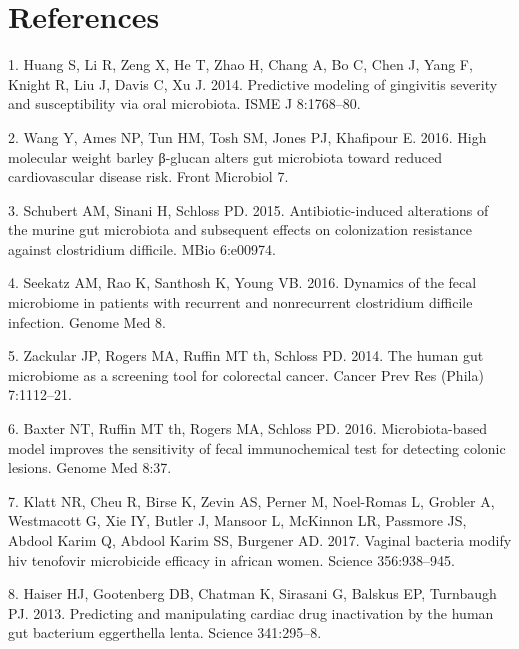 \documentclass[11pt,]{article}
\begin{document}
\newpage

\section*{References}\label{references}

\hypertarget{refs}{}
\hypertarget{ref-Huang_gingivitis_2014}{}
1. Huang S, Li R, Zeng X, He T, Zhao H, Chang A, Bo C, Chen J, Yang F,
Knight R, Liu J, Davis C, Xu J. 2014. Predictive modeling of gingivitis
severity and susceptibility via oral microbiota. ISME J 8:1768--80.

\hypertarget{ref-Wang_cvdrisk_2016}{}
2. Wang Y, Ames NP, Tun HM, Tosh SM, Jones PJ, Khafipour E. 2016. High
molecular weight barley β-glucan alters gut microbiota toward reduced
cardiovascular disease risk. Front Microbiol 7.

\hypertarget{ref-Schubert_cdiff_2015}{}
3. Schubert AM, Sinani H, Schloss PD. 2015. Antibiotic-induced
alterations of the murine gut microbiota and subsequent effects on
colonization resistance against clostridium difficile. MBio 6:e00974.

\hypertarget{ref-Seekatz_cdiff_2016}{}
4. Seekatz AM, Rao K, Santhosh K, Young VB. 2016. Dynamics of the fecal
microbiome in patients with recurrent and nonrecurrent clostridium
difficile infection. Genome Med 8.

\hypertarget{ref-zackular_CRC_2014}{}
5. Zackular JP, Rogers MA, Ruffin MT th, Schloss PD. 2014. The human gut
microbiome as a screening tool for colorectal cancer. Cancer Prev Res
(Phila) 7:1112--21.

\hypertarget{ref-baxter_FIT_2016}{}
6. Baxter NT, Ruffin MT th, Rogers MA, Schloss PD. 2016.
Microbiota-based model improves the sensitivity of fecal immunochemical
test for detecting colonic lesions. Genome Med 8:37.

\hypertarget{ref-Klatt_microbicide_2017}{}
7. Klatt NR, Cheu R, Birse K, Zevin AS, Perner M, Noel-Romas L, Grobler
A, Westmacott G, Xie IY, Butler J, Mansoor L, McKinnon LR, Passmore JS,
Abdool Karim Q, Abdool Karim SS, Burgener AD. 2017. Vaginal bacteria
modify hiv tenofovir microbicide efficacy in african women. Science
356:938--945.

\hypertarget{ref-Haiser_cardiac_2013}{}
8. Haiser HJ, Gootenberg DB, Chatman K, Sirasani G, Balskus EP,
Turnbaugh PJ. 2013. Predicting and manipulating cardiac drug
inactivation by the human gut bacterium eggerthella lenta. Science
341:295--8.
\end{document}
